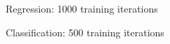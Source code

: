 \begin{frame}{Regression: 1000 training iterations}
{}



\end{frame}
\begin{frame}{Classification: 500 training iterations}


\end{frame}
